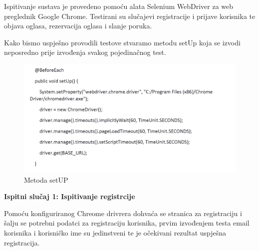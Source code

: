 			
			Ispitivanje sustava je provedeno pomoću alata Selenium WebDriver za web preglednik Google Chrome. Testirani su slučajevi registracije i prijave korisnika te objava oglasa, rezervacija oglasa i slanje poruka.
			
			
			Kako bismo uspješno provodili testove stvaramo metodu setUp koja se izvodi neposredno prije izvođenja svakog pojedinačnog test. 
			
			\begin{figure}[H]
				\includegraphics[scale=0.6]{slike/prije.PNG} %
				\centering
				\caption{Metoda setUP }
				\label{fig:prije}
			\end{figure}
			
			
			\textbf{Ispitni slučaj 1: Ispitivanje registrcije}
			
		Pomoću konfiguriranog Chreome drivrera dohvaća se stranica za registraciju i šalju se potrebni podatci za registraciju korisnika, prvim izvođenjem testa email korisnika i korisničko ime su jedinstveni te je očekivani rezultat uspješna registracija.
			
			
			
